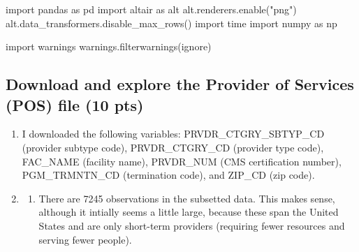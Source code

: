 \documentclass[
  letterpaper,
  DIV=11,
  numbers=noendperiod]{scrartcl}
\newenvironment{Shaded}{\begin{snugshade}}{\end{snugshade}}
\newcommand{\ImportTok}[1]{\textcolor[rgb]{0.00,0.46,0.62}{#1}}
\newcommand{\NormalTok}[1]{\textcolor[rgb]{0.00,0.23,0.31}{#1}}
\newcommand{\StringTok}[1]{\textcolor[rgb]{0.13,0.47,0.30}{#1}}
\providecommand{\tightlist}{%
  \setlength{\itemsep}{0pt}\setlength{\parskip}{0pt}}\usepackage{longtable,booktabs,array}
\begin{document}
\begin{Shaded}
\begin{Highlighting}[]
\ImportTok{import}\NormalTok{ pandas }\ImportTok{as}\NormalTok{ pd}
\ImportTok{import}\NormalTok{ altair }\ImportTok{as}\NormalTok{ alt}
\NormalTok{alt.renderers.enable(}\StringTok{"png"}\NormalTok{)}
\NormalTok{alt.data\_transformers.disable\_max\_rows()}
\ImportTok{import}\NormalTok{ time}
\ImportTok{import}\NormalTok{ numpy }\ImportTok{as}\NormalTok{ np}

\ImportTok{import}\NormalTok{ warnings }
\NormalTok{warnings.filterwarnings(}\StringTok{\textquotesingle{}ignore\textquotesingle{}}\NormalTok{)}
\end{Highlighting}
\end{Shaded}

\subsection{Download and explore the Provider of Services (POS) file (10
pts)}\label{download-and-explore-the-provider-of-services-pos-file-10-pts}

\begin{enumerate}
\def\labelenumi{\arabic{enumi}.}
\item
  I downloaded the following variables: PRVDR\_CTGRY\_SBTYP\_CD
  (provider subtype code), PRVDR\_CTGRY\_CD (provider type code),
  FAC\_NAME (facility name), PRVDR\_NUM (CMS certification number),
  PGM\_TRMNTN\_CD (termination code), and ZIP\_CD (zip code).
\item
  \begin{enumerate}
  \def\labelenumii{\alph{enumii}.}
  \tightlist
  \item
    There are 7245 observations in the subsetted data. This makes sense,
    although it intially seems a little large, because these span the
    United States and are only short-term providers (requiring fewer
    resources and serving fewer people).
  \end{enumerate}
\end{enumerate}
\end{document}
